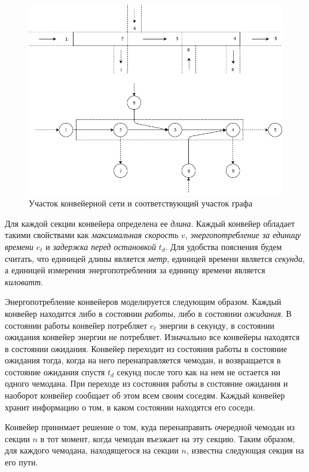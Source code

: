 \documentclass[specification, annotation]{itmo-student-thesis}
\begin{document}
\begin{figure}[!h]
  \caption{Участок конвейерной сети и соответствующий участок
    графа}\label{conveyors-illustration}
  \centering
  \includegraphics[scale=0.6]{belt-illustration}
\end{figure}

Для каждой секции конвейера определена ее \textit{длина}. Каждый конвейер
обладает такими свойствами как \textit{максимальная скорость} $v$,
\textit{энергопотребление за единицу времени} $e_t$ и \textit{задержка перед
  остановкой} $t_d$. Для удобства пояснения будем считать, что единицей длины
является \textit{метр}, единицей времени является \textit{секунда}, а единицей
измерения энергопотребления за единицу времени является \textit{киловатт}.

Энергопотребление конвейеров моделируется следующим образом. Каждый конвейер
находится либо в состоянии \textit{работы}, либо в состоянии \textit{ожидания}.
В состоянии работы конвейер потребляет $e_t$ энергии в секунду, в состоянии
ожидания конвейер энергии не потребляет. Изначально все конвейеры находятся в
состоянии ожидания. Конвейер переходит из состояния работы в состояние ожидания
тогда, когда на него перенаправляется чемодан, и возвращается в состояние
ожидания спустя $t_d$ секунд после того как на нем не остается ни одного
чемодана. При переходе из состояния работы в состояние ожидания и наоборот
конвейер сообщает об этом всем своим соседям. Каждый конвейер хранит информацию
о том, в каком состоянии находятся его соседи.

Конвейер принимает решение о том, куда перенаправить очередной чемодан из секции
$n$ в тот момент, когда чемодан въезжает на эту секцию. Таким образом, для
каждого чемодана, находящегося на секции $n$, известна следующая секция на его пути.
\end{document}

